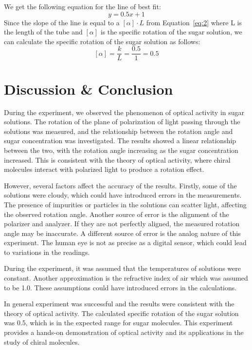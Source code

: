 \documentclass[10pt]{article}
\newcommand{\td}[1]{\todo[linecolor=blue, backgroundcolor=blue!25,bordercolor=blue, size=\small]{#1}}
\begin{document}
We get the following equation for the line of best fit:
\td{Add equation here}
\begin{equation}
    y = 0.5x + 1
\end{equation}
Since the slope of the line is equal to a $\left[\alpha\right]\cdot L$ from Equation~\ref{eq:2} where L is the length of the tube and $\left[\alpha\right]$ is the specific rotation of the sugar solution, we can calculate the specific rotation of the sugar solution as follows:
\td{fix these numbers}
\begin{equation}
    \left[\alpha\right] = \frac{k}{L} = \frac{0.5}{1} = 0.5
\end{equation} 

\section{Discussion \& Conclusion}

During the experiment, we observed the phenomenon of optical activity in sugar solutions. The rotation of the plane of polarization of light passing through the solutions was measured, and the relationship between the rotation angle and sugar concentration was investigated. The results showed a linear relationship between the two, with the rotation angle increasing as the sugar concentration increased. This is consistent with the theory of optical activity, where chiral molecules interact with polarized light to produce a rotation effect.

However, several factors affect the accuracy of the results. Firstly, some of the solutions were cloudy, which could have introduced errors in the measurements. The presence of impurities or particles in the solutions can scatter light, affecting the observed rotation angle. Another source of error is the alignment of the polarizer and analyzer. If they are not perfectly aligned, the measured rotation angle may be inaccurate. A different source of error is the analog nature of this experiment. The human eye is not as precise as a digital sensor, which could lead to variations in the readings.

During the experiment, it was assumed that the temperatures of solutions were constant. Another approximation is the refractive index of air which was assumed to be 1.0. These assumptions could have introduced errors in the calculations.   

In general experiment was successful and the results were consistent with the theory of optical activity. The calculated specific rotation of the sugar solution was 0.5, which is in the expected range for sugar molecules. This experiment provides a hands-on demonstration of optical activity and its applications in the study of chiral molecules.
\end{document}
